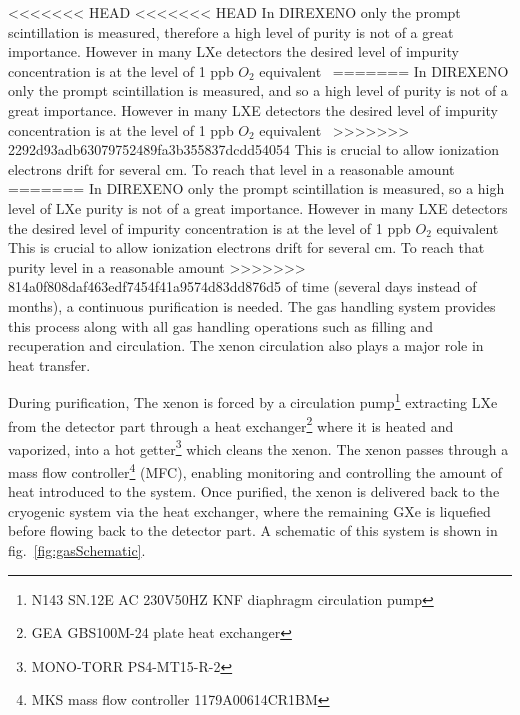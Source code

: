 <<<<<<< HEAD
<<<<<<< HEAD
In DIREXENO only the prompt scintillation is measured, therefore a high level of purity is not of a great importance. However in many LXe detectors the desired level of impurity concentration is at the level of 1 ppb $O_2$ equivalent~\cite{Aprile:2009dv}
=======
In DIREXENO only the prompt scintillation is measured, and so a high level of purity is not of a great importance. However in many LXE detectors the desired level of impurity concentration is at the level of 1 ppb $O_2$ equivalent~\cite{Aprile:2009dv}
>>>>>>> 2292d93adb63079752489fa3b355837dcdd54054
This is crucial to allow 
ionization electrons drift for several cm. To reach that level in a reasonable amount 
=======
In DIREXENO only the prompt scintillation is measured, so a high level of LXe purity is not of a great importance. However in many LXE detectors the desired level of impurity concentration is at the level of 1 ppb $O_2$ equivalent~\cite{Aprile:2009dv} This is crucial to allow 
ionization electrons drift for several cm. To reach that purity level in a reasonable amount 
>>>>>>> 814a0f808daf463edf7454f41a9574d83dd876d5
of time (several days instead of months), 
a continuous purification is needed. The gas handling system provides this process along 
with all gas handling operations such as filling and recuperation and circulation. The xenon circulation also plays a major role in heat transfer.


During purification, The xenon is forced by a circulation pump\footnote{N143 SN.12E AC 230V50HZ KNF diaphragm circulation pump} extracting LXe from the detector part through a heat exchanger\footnote{GEA GBS100M-24 plate heat exchanger} 
where it is heated and vaporized, into a hot getter\footnote{MONO-TORR PS4-MT15-R-2} which cleans the xenon. The xenon passes through a mass flow controller\footnote{MKS mass flow controller 1179A00614CR1BM} (MFC), 
enabling monitoring and controlling the amount of heat introduced to the system.  Once purified, the xenon is delivered back to the cryogenic system 
via the heat exchanger, where the remaining GXe is 
liquefied before flowing back to the detector part. A schematic of this 
system is shown in fig.~\ref{fig:gasSchematic}.


